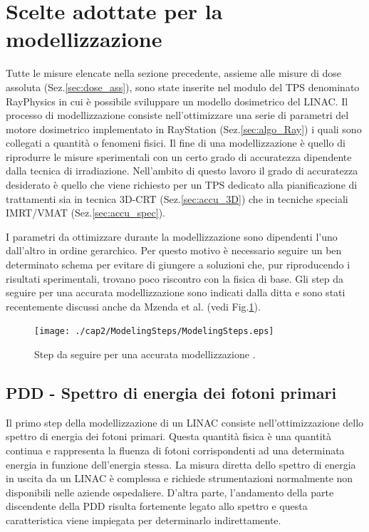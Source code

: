 \section{Scelte adottate per la modellizzazione}
Tutte le misure elencate nella sezione precedente, assieme alle misure di dose assoluta (Sez.\ref{sec:dose_ass}), sono state inserite nel modulo del TPS denominato RayPhysics in cui è possibile sviluppare un modello dosimetrico del LINAC. Il processo di modellizzazione consiste nell'ottimizzare una serie di parametri del motore dosimetrico implementato in RayStation (Sez.\ref{sec:algo_Ray}) i quali sono collegati a quantità o fenomeni fisici. Il fine di una modellizzazione è quello di riprodurre le misure sperimentali con un certo grado di accuratezza dipendente dalla tecnica di irradiazione. Nell'ambito di questo lavoro il grado di accuratezza desiderato è quello che viene richiesto per un TPS dedicato alla pianificazione di trattamenti sia in tecnica 3D-CRT (Sez.\ref{sec:accu_3D}) che in tecniche speciali IMRT/VMAT (Sez.\ref{sec:accu_spec}).

I parametri da ottimizzare durante la modellizzazione sono dipendenti l'uno dall'altro in ordine gerarchico. Per questo motivo è necessario seguire un ben determinato schema per evitare di giungere a soluzioni che, pur riproducendo i risultati sperimentali, trovano poco riscontro con la fisica di base. Gli step da seguire per una accurata modellizzazione sono indicati dalla ditta \cite{RaySearchLaboratories2014} e sono stati recentemente discussi anche da Mzenda et al.\cite{Mzenda2014} (vedi Fig.\ref{fig:modeling_steps}).
\begin{figure}
\centering
\texttt{[image: ./cap2/ModelingSteps/ModelingSteps.eps]}
\caption{Step da seguire per una accurata modellizzazione \cite{Mzenda2014}.}
\label{fig:modeling_steps}
\end{figure}

\subsection{PDD - Spettro di energia dei fotoni primari}
Il primo step della modellizzazione di un LINAC consiste nell'ottimizzazione dello spettro di energia dei fotoni primari. Questa quantità fisica è una quantità continua e rappresenta la fluenza di fotoni corrispondenti ad una determinata energia in funzione dell'energia stessa. La misura diretta dello spettro di energia in uscita da un LINAC è complessa e richiede strumentazioni normalmente non disponibili nelle aziende ospedaliere. D'altra parte, l'andamento della parte discendente della PDD risulta fortemente legato allo spettro \cite{Khan2010} e questa caratteristica viene impiegata per determinarlo indirettamente.

